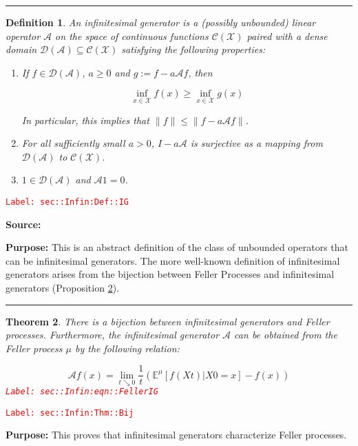 \documentclass[12pt]{article}
\newcommand{\mb}{\mathbb}
\newcommand{\mc}{\mathcal}
\newcommand{\tr}{\textcolor{red}}
\newcommand{\labe}[1]{\tr{\texttt{Label: #1}}}
\newcommand{\purpose}{\textbf{Purpose: }}
\newcommand{\lin}{\rule{\linewidth}{0.4 pt}}
\newcommand{\exmu}[2]{\mb{E}^{#1}\left[#2\right]}	%
\newcommand{\x}{x}								%
\renewcommand{\t}{t}							%
\newcommand{\X}{X}								%
\newcommand{\IG}{\mc{A}}						%
\newcommand{\core}{\mc{D}}						%
\newcommand{\cont}{\mc{C}}						%
\newcommand{\m}{\mu}							%
\newcommand{\spce}{\mc{X}}						%
\newtheorem{thms}{Theorem}[section]
\newtheorem{defn}[thms]{Definition}
\begin{document}
\lin

\begin{defn}
An infinitesimal generator is a (possibly unbounded) linear operator \(\IG{}\) on the space of continuous functions \(\cont(\spce)\) paired with a dense domain \(\core(\IG{}) \subseteq \cont(\spce)\) satisfying the following properties:

\begin{enumerate}
\item If \(f \in \mc{D}(\IG{})\), \(a \geq 0\) and \(g:= f - a\IG{} f\), then 

\[\inf_{\x \in \spce} f(\x) \geq \inf_{\x \in \spce} g(\x)\]

\noindent In particular, this implies that \(\|f\| \leq \|f - a\IG{} f\|\).

\item For all sufficiently small \(a > 0\), \(I - a\IG{}\) is surjective as a mapping from \(\mc{D}(\IG{})\) to \(\cont(\spce)\).

\item \(1 \in \core(\IG{})\) and \(\IG{} 1 = 0\).
\end{enumerate}
\label{sec::Infin:Def::IG}
\end{defn}
\labe{sec::Infin:Def::IG}

\textbf{Source: }\cite[Definitions 2.1,2.7]{Lig85}

\purpose This is an abstract definition of the class of unbounded operators that can be infinitesimal generators. The more well-known definition of infinitesimal generators arises from the bijection between Feller Processes and infinitesimal generators (Proposition \ref{sec::Infin:Thm::Bij}).

\lin

\begin{thms}
There is a bijection between infinitesimal generators and Feller processes. Furthermore, the infinitesimal generator \(\IG{}\) can be obtained from the Feller process \(\m\) by the following relation:

\begin{equation}
\IG f(\x) = \lim_{\t\searrow 0} \frac{1}{\t}\left(\exmu{\m}{f(\X{}{\t})|\X{}{0}=\x} - f(\x)\right)
\label{sec::Infin:eqn::FellerIG}
\end{equation}
\labe{sec::Infin:eqn::FellerIG}
\label{sec::Infin:Thm::Bij}
\end{thms}
\labe{sec::Infin:Thm::Bij}

\purpose This proves that infinitesimal generators characterize Feller processes.
\end{document}
